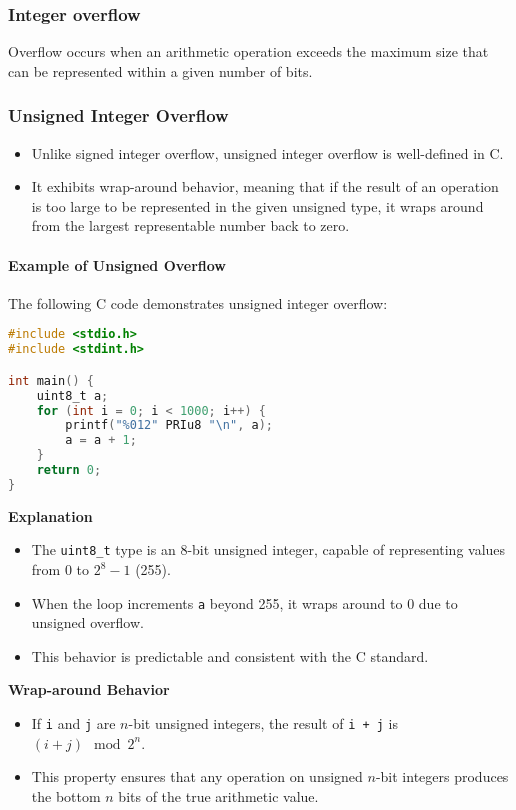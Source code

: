 \documentclass[12pt]{article}
\begin{document}
\subsubsection{Integer overflow}
Overflow occurs when an arithmetic operation exceeds the maximum size that can be represented within a given number of bits.

\subsubsection{Unsigned Integer Overflow}

\begin{itemize}
    \item Unlike signed integer overflow, unsigned integer overflow is well-defined in C.
    \item It exhibits wrap-around behavior, meaning that if the result of an operation is too large to be represented in the given unsigned type, it wraps around from the largest representable number back to zero.
\end{itemize}

\paragraph{Example of Unsigned Overflow}

The following C code demonstrates unsigned integer overflow:

\begin{lstlisting}[language=C]
#include <stdio.h>
#include <stdint.h>

int main() {
    uint8_t a;
    for (int i = 0; i < 1000; i++) {
        printf("%012" PRIu8 "\n", a);
        a = a + 1;
    }
    return 0;
}
\end{lstlisting}

\textbf{Explanation}
\begin{itemize}
    \item The \texttt{uint8\_t} type is an 8-bit unsigned integer, capable of representing values from 0 to \(2^8 - 1\) (255).
    \item When the loop increments \texttt{a} beyond 255, it wraps around to 0 due to unsigned overflow.
    \item This behavior is predictable and consistent with the C standard.
\end{itemize}

\textbf{Wrap-around Behavior}

\begin{itemize}
    \item If \texttt{i} and \texttt{j} are \(n\)-bit unsigned integers, the result of \texttt{i + j} is \((i + j) \mod 2^n\).
    \item This property ensures that any operation on unsigned \(n\)-bit integers produces the bottom \(n\) bits of the true arithmetic value.
\end{itemize}
\end{document}
